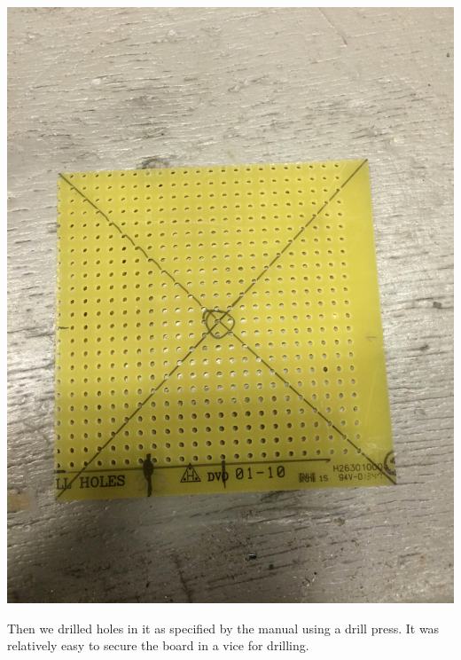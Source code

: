 \documentclass[11pt]{article} %
\begin{document}
\begin{center}
\includegraphics[scale=0.08]{feed/15.jpeg}
\end{center}


Then we drilled holes in it as specified by the manual using a drill press. It was relatively easy to secure the board in a vice for drilling. 
\end{document}
